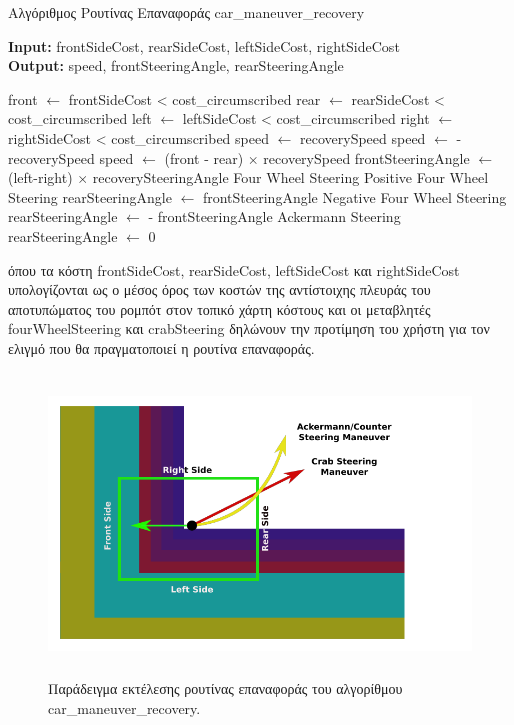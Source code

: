 \newpage
\begin{algorithm}[!ht]
	\caption{Αλγόριθμος Ρουτίνας Επαναφοράς car{\_}maneuver{\_}recovery}
	\label{alg:car_maneuver_recovery}
	\textbf{Input:} frontSideCost, rearSideCost, leftSideCost, rightSideCost\\
	\textbf{Output:} speed, frontSteeringAngle, rearSteeringAngle
	\begin{algorithmic}[1]
		\State front $\leftarrow$ frontSideCost < cost{\_}circumscribed
		\State rear  $\leftarrow$ rearSideCost < cost{\_}circumscribed
		\State left  $\leftarrow$ leftSideCost < cost{\_}circumscribed
		\State right $\leftarrow$ rightSideCost < cost{\_}circumscribed
				\State speed $\leftarrow$ recoverySpeed
			\Else
				\State speed $\leftarrow$ -recoverySpeed
			\EndIf
		\Else
			\State speed $\leftarrow$ (front - rear) $\times$ recoverySpeed
		\EndIf
		\State frontSteeringAngle $\leftarrow$ (left-right) $\times$ recoverySteeringAngle
			\Comment Four Wheel Steering
			 \Comment Positive Four Wheel Steering
				\State rearSteeringAngle $\leftarrow$ frontSteeringAngle
			\Else \Comment Negative Four Wheel Steering
				\State rearSteeringAngle $\leftarrow$ - frontSteeringAngle
			\EndIf
		\Else \Comment Ackermann Steering
			\State rearSteeringAngle $\leftarrow$ 0
		\EndIf
	\end{algorithmic}
\end{algorithm}

\bigskip
\noindent
όπου τα κόστη frontSideCost, rearSideCost, leftSideCost και rightSideCost υπολογίζονται ως ο μέσος όρος των κοστών της αντίστοιχης πλευράς του αποτυπώματος του ρομπότ στον τοπικό χάρτη κόστους και οι μεταβλητές fourWheelSteering και crabSteering δηλώνουν την προτίμηση του χρήστη για τον ελιγμό που θα πραγματοποιεί η ρουτίνα επαναφοράς.

\begin{figure}[!ht]
	\centering
	\includegraphics[height=8cm]{Chapters/Chapter4/Figures/car_maneuver_recovery_example.png}
	\caption{Παράδειγμα εκτέλεσης ρουτίνας επαναφοράς του αλγορίθμου car{\_}maneuver{\_}recovery.}
	\label{fig:car_maneuver_recovery_example}
\end{figure}


